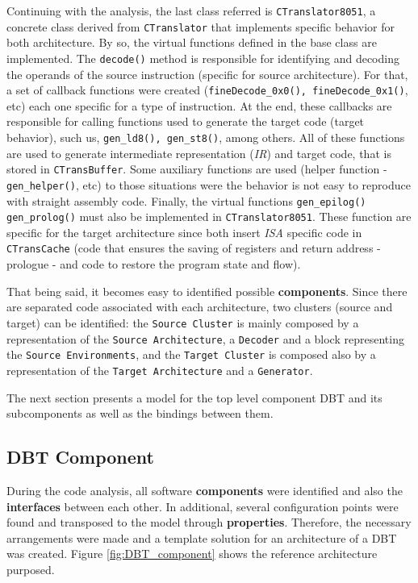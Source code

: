 \documentclass[12pt]{article}
\begin{document}
{Continuing with the analysis, the last class referred is \texttt{CTranslator8051}, a concrete class derived from \texttt{CTranslator} that implements specific behavior for both architecture. By so, the virtual functions defined in the base class are implemented. The \texttt{decode()} method is responsible for identifying and decoding the operands of the source instruction (specific for source architecture). For that, a set of callback functions were created (\texttt{fineDecode\_0x0(), fineDecode\_0x1()}, etc) each one specific for a type of instruction. At the end, these callbacks are responsible for calling functions used to generate the target code (target behavior), such us, \texttt{gen\_ld8(), gen\_st8()}, among others. All of these functions are used to generate intermediate representation (\textit{IR}) and target code, that is stored in \texttt{CTransBuffer}. Some auxiliary functions are used (helper function - \texttt{gen\_helper()}, etc) to those situations were the behavior is not easy to reproduce with straight assembly code.
Finally, the virtual functions \texttt{gen\_epilog()} \texttt{gen\_prolog()} must also be implemented in \texttt{CTranslator8051}. These function are specific for the target architecture since both insert \textit{ISA} specific code in \texttt{CTransCache} (code that ensures the saving of registers and return address - prologue - and code to restore the program state and flow).

That being said, it becomes easy to identified possible \textbf{components}. Since there are separated code associated with each architecture, two clusters (source and target) can be identified: the \texttt{Source Cluster} is mainly composed by a representation of the \texttt{Source Architecture}, a \texttt{Decoder} and a block representing the \texttt{Source Environments}, and the \texttt{Target Cluster} is composed also by a representation of the  \texttt{Target Architecture} and a  \texttt{Generator}.  

The next section presents a model for the top level component DBT and its subcomponents as well as the bindings between them. 

\subsection{DBT Component}

During the code analysis, all software \textbf{components} were identified and also the \textbf{interfaces} between each other. In additional, several configuration points were found and transposed to the model through \textbf{properties}. Therefore, the necessary arrangements were made and a template solution for an architecture of a DBT was created. Figure \ref{fig:DBT_component} shows the reference architecture purposed.

}
\end{document}
